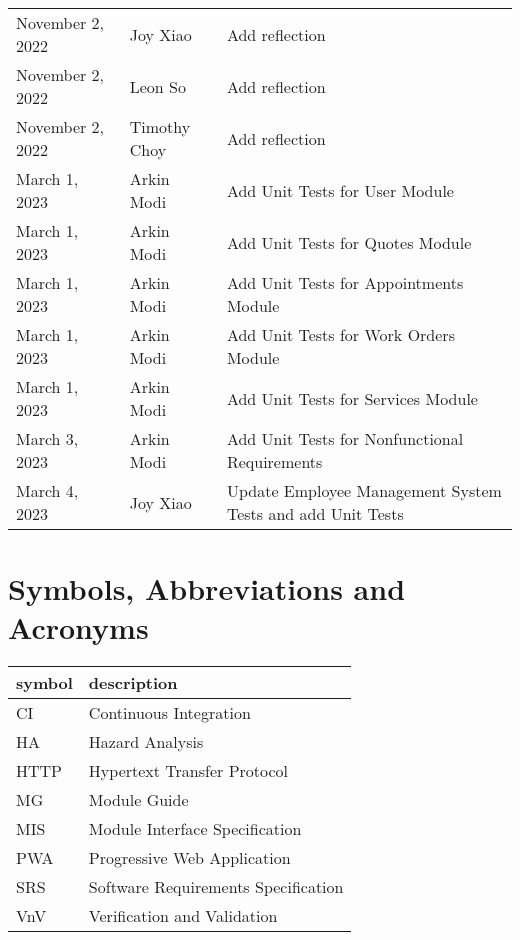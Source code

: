 \documentclass[12pt, titlepage]{article}
\begin{document}
\begin{longtable}{p{} p{} p{}}
	November 2, 2022 & Joy Xiao              & Add reflection                                             \\
	November 2, 2022 & Leon So               & Add reflection                                             \\
	November 2, 2022 & Timothy Choy          & Add reflection                                             \\
	March 1, 2023    & Arkin Modi            & Add Unit Tests for User Module                             \\
	March 1, 2023    & Arkin Modi            & Add Unit Tests for Quotes Module                           \\
	March 1, 2023    & Arkin Modi            & Add Unit Tests for Appointments Module                     \\
	March 1, 2023    & Arkin Modi            & Add Unit Tests for Work Orders Module                      \\
	March 1, 2023    & Arkin Modi            & Add Unit Tests for Services Module                         \\
	March 3, 2023    & Arkin Modi            & Add Unit Tests for Nonfunctional Requirements              \\
	March 4, 2023    & Joy Xiao              & Update Employee Management System Tests and add Unit Tests \\
	\bottomrule
\end{longtable}

\newpage

\tableofcontents

\listoftables

\listoffigures

\newpage

\section{Symbols, Abbreviations and Acronyms}

\renewcommand{\arraystretch}{1.2}
\begin{tabular}{l l}
	\toprule
	\textbf{symbol} & \textbf{description}                \\
	\midrule
	CI              & Continuous Integration              \\
	HA              & Hazard Analysis                     \\
	HTTP            & Hypertext Transfer Protocol         \\
	MG              & Module Guide                        \\
	MIS             & Module Interface Specification      \\
	PWA             & Progressive Web Application         \\
	SRS             & Software Requirements Specification \\
	VnV             & Verification and Validation         \\
	\bottomrule
\end{tabular}\\
\end{document}
